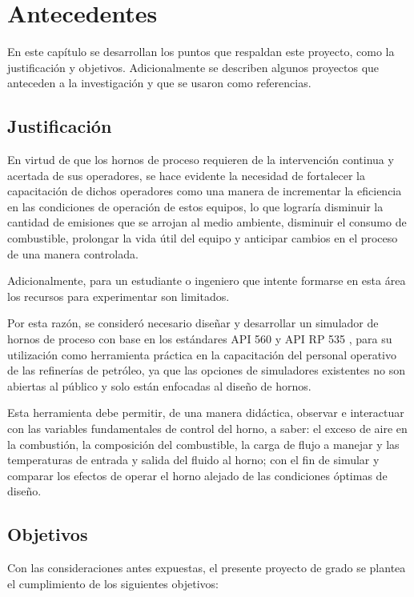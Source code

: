 \chapter{Antecedentes}

\par En este capítulo se desarrollan los puntos que respaldan este proyecto, como la justificación y objetivos. Adicionalmente se describen algunos proyectos que anteceden a la investigación y que se usaron como referencias.

\section{Justificación}

\par En virtud de que los hornos de proceso requieren de la intervención continua y acertada de sus operadores, se hace evidente la necesidad de fortalecer la capacitación de dichos operadores como una manera de incrementar la eficiencia en las condiciones de operación de estos equipos, lo que lograría disminuir la cantidad de emisiones que se arrojan al medio ambiente, disminuir el consumo de combustible, prolongar la vida útil del equipo y anticipar cambios en el proceso de una manera controlada.
\par Adicionalmente, para un estudiante o ingeniero que intente formarse en esta área los recursos para experimentar son limitados.
\par Por esta razón, se consideró necesario diseñar y desarrollar un simulador de hornos de proceso con base en los estándares API 560 \cite{bib:api560} y API RP 535 \cite{bib:api535}, para su utilización como herramienta práctica en la capacitación del personal operativo de las refinerías de petróleo, ya que las opciones de simuladores existentes no son abiertas al público y solo están enfocadas al diseño de hornos.
\par Esta herramienta debe permitir, de una manera didáctica, observar e interactuar con las variables fundamentales de control del horno, a saber: el exceso de aire en la combustión, la composición del combustible, la carga de flujo a manejar y las temperaturas de entrada y salida del fluido al horno; con el fin de simular y comparar los efectos de operar el horno alejado de las condiciones óptimas de diseño.

\section{Objetivos}
\par Con las consideraciones antes expuestas, el presente proyecto de grado se plantea el cumplimiento de los siguientes objetivos:

